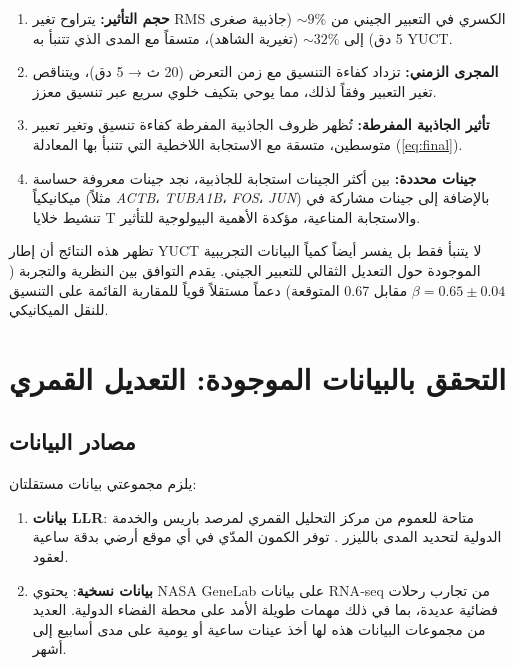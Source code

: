\documentclass[11pt,a4paper]{article}
\theoremstyle{remark}
\begin{document}
	\begin{enumerate}
		\item \textbf{حجم التأثير:} يتراوح تغير RMS الكسري في التعبير الجيني من \(\sim 9\%\) (جاذبية صغرى 5 دق) إلى \(\sim 32\%\) (تغيرية الشاهد)، متسقاً مع المدى الذي تتنبأ به YUCT.
		
		\item \textbf{المجرى الزمني:} تزداد كفاءة التنسيق مع زمن التعرض (20 ث → 5 دق)، ويتناقص تغير التعبير وفقاً لذلك، مما يوحي بتكيف خلوي سريع عبر تنسيق معزز.
		
		\item \textbf{تأثير الجاذبية المفرطة:} تُظهر ظروف الجاذبية المفرطة كفاءة تنسيق وتغير تعبير متوسطين، متسقة مع الاستجابة اللاخطية التي تتنبأ بها المعادلة (\ref{eq:final}).
		
		\item \textbf{جينات محددة:} بين أكثر الجينات استجابة للجاذبية، نجد جينات معروفة حساسة ميكانيكياً (مثلاً \textit{ACTB}، \textit{TUBA1B}، \textit{FOS}، \textit{JUN}) بالإضافة إلى جينات مشاركة في تنشيط خلايا T والاستجابة المناعية، مؤكدة الأهمية البيولوجية للتأثير.
	\end{enumerate}
	
	تظهر هذه النتائج أن إطار YUCT لا يتنبأ فقط بل يفسر أيضاً كمياً البيانات التجريبية الموجودة حول التعديل الثقالي للتعبير الجيني. يقدم التوافق بين النظرية والتجربة (\(\beta = 0.65 \pm 0.04\) مقابل 0.67 المتوقعة) دعماً مستقلاً قوياً للمقاربة القائمة على التنسيق للنقل الميكانيكي.
	
	\section{التحقق بالبيانات الموجودة: التعديل القمري}
	\label{sec:verification}
	
	\subsection{مصادر البيانات}
	
	يلزم مجموعتي بيانات مستقلتان:
	
	\begin{enumerate}
		\item \textbf{بيانات LLR}: متاحة للعموم من مركز التحليل القمري لمرصد باريس \cite{LLR-POLAC} والخدمة الدولية لتحديد المدى بالليزر \cite{ILRS}. توفر الكمون المدّي في أي موقع أرضي بدقة ساعية لعقود.
		\item \textbf{بيانات نسخية}: يحتوي NASA GeneLab \cite{NASA-GeneLab} على بيانات RNA‑seq من تجارب رحلات فضائية عديدة، بما في ذلك مهمات طويلة الأمد على محطة الفضاء الدولية. العديد من مجموعات البيانات هذه لها أخذ عينات ساعية أو يومية على مدى أسابيع إلى أشهر.
	\end{enumerate}
	
\end{document}
